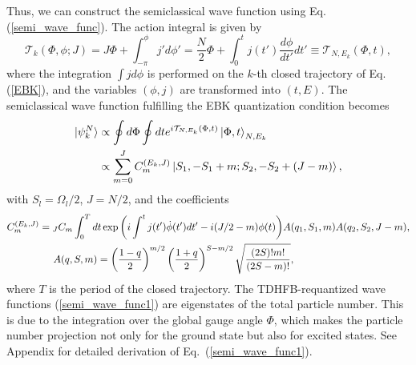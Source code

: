 \documentclass[%
superscriptaddress,
preprint,
showpacs,
nofootinbib,
amsmath,amssymb,
aps,
prc,
floatfix ]%
{revtex4-1}
\begin{document}
Thus, we can construct the semiclassical wave function using
Eq. (\ref{semi_wave_func}).
The action integral is given by
\begin{equation}
	\mathcal{T}_k(\Phi,\phi;J)
	= J\Phi + \int^\phi_{-\pi} j' d\phi' 
	= \frac{N}{2}\Phi + \int^t_0   %
	j(t') \frac{d\phi}{dt'} dt' 
\equiv \mathcal{T}_{N,E_k}(\Phi,t) ,
\end{equation}
where the integration $\int j d\phi$ is performed on the $k$-th
closed trajectory of Eq. (\ref{EBK}), and
the variables $(\phi,j)$ are transformed into $(t,E)$.
The semiclassical wave function fulfilling the EBK quantization condition
becomes
\begin{align}
	\ket{\psi_k^N} &\propto \oint d\Phi \oint dt
	e^{i\mathcal{T}_{N,E_k}(\Phi, t)}
	\ket{\Phi,t}_{N,E_k} \label{semi_wave_func0} \\
  &\propto \sum_{m=0}^{J}C_m^{(E_k,J)}\ket{S_1,-S_1+m;S_2,-S_2+(J-m)} ,
	\label{semi_wave_func1}
\end{align}
with $S_l=\Omega_l/2$, $J=N/2$, and the coefficients
\begin{align}
  C_m^{(E_k,J)} &= {}_J C_m\int_0^T dt \exp{\left( i\int^t j(t') \dot{\phi}(t') dt'-i(J/2-m)\phi(t) \right)}A(q_1,S_1,m)A(q_2,S_2,J-m) ,\\
  & \hspace{5mm} A(q,S,m) = \left(\frac{1-q}{2}\right)^{m/2}\left(\frac{1+q}{2}\right)^{S-m/2}\sqrt{\frac{(2S)!m!}{(2S-m)!}}, \hspace{5mm} \nonumber
\end{align}
where $T$ is the period of the closed trajectory.
The TDHFB-requantized wave functions (\ref{semi_wave_func1}) are
eigenstates of the total particle number.
This is due to the integration over the global gauge angle $\Phi$,
which makes the particle number projection not only for the ground state
but also for excited states.
See Appendix for detailed derivation of Eq.~(\ref{semi_wave_func1}). 
\end{document}
